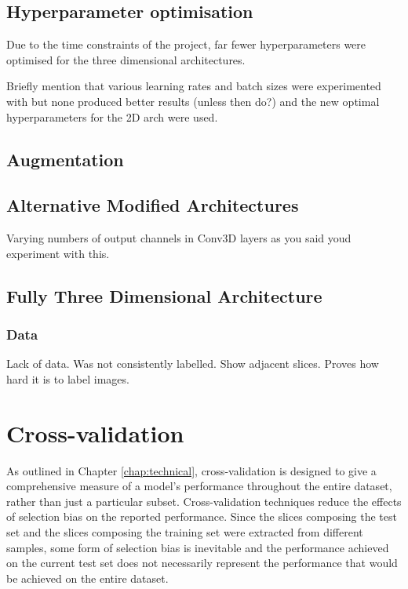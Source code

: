 \subsection{Hyperparameter optimisation}

Due to the time constraints of the project, far fewer hyperparameters were optimised for the three dimensional architectures.

Briefly mention that various learning rates and batch sizes were experimented with but none produced better results (unless then do?) and the new optimal hyperparameters for the 2D arch were used.

\subsection{Augmentation}

\subsection{Alternative Modified Architectures}

Varying numbers of output channels in Conv3D layers as you said youd experiment with this.

\subsection{Fully Three Dimensional Architecture}

\subsubsection{Data}

Lack of data. Was not consistently labelled. Show adjacent slices. Proves how hard it is to label images.

\section{Cross-validation}
\label{sec:evalcrossval}

As outlined in Chapter \ref{chap:technical}, cross-validation is designed to give a comprehensive measure of a model's performance throughout the entire dataset, rather than just a particular subset. Cross-validation techniques reduce the effects of selection bias on the reported performance. Since the slices composing the test set and the slices composing the training set were extracted from different samples, some form of selection bias is inevitable and the performance achieved on the current test set does not necessarily represent the performance that would be achieved on the entire dataset.

